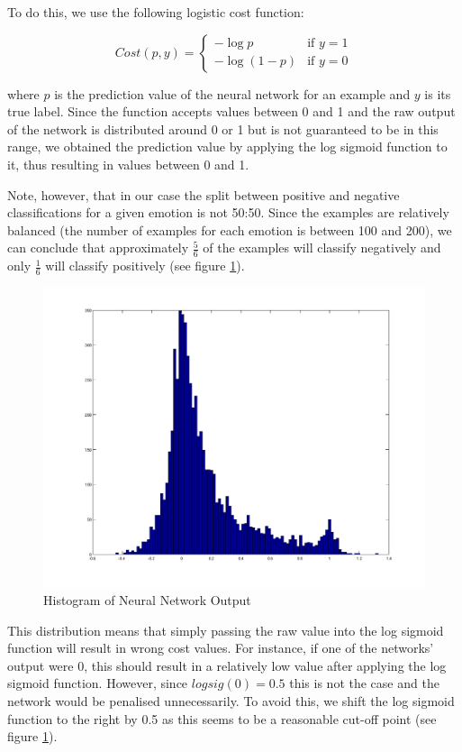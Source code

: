 \documentclass[10pt,a4paper]{article}
\begin{document}
To do this, we use the following logistic cost function:

\[
    Cost(p, y)= 
\begin{cases}
    -\log{p}& \text{if } y = 1\\
    -\log{(1 - p)}              & \text{if } y = 0
\end{cases}
\]

where $p$ is the prediction value of the neural network for an example and $y$ is its true label. Since the function accepts values between 0 and 1 and the raw output of the network is distributed around 0 or 1 but is not guaranteed to be in this range, we obtained the prediction value by applying the log sigmoid function to it, thus resulting in values between 0 and 1. 

Note, however, that in our case the split between positive and negative classifications for a given emotion is not 50:50. Since the examples are relatively balanced (the number of examples for each emotion is between 100 and 200), we can conclude that approximately $\frac{5}{6}$ of the examples will classify negatively and only $\frac{1}{6}$ will classify positively (see figure \ref{fig:examplesDistribution}).

\begin{figure}[!ht]
     \centering
     \includegraphics[scale=0.3]{../../images/clean_hist.png}
     \caption{Histogram of Neural Network Output}
     \label{fig:examplesDistribution}
\end{figure}

This distribution means that simply passing the raw value into the log sigmoid function will result in wrong cost values. For instance, if one of the networks' output were 0, this should result in a relatively low value after applying the log sigmoid function. However, since $logsig(0) = 0.5$ this is not the case and the network would be penalised unnecessarily. To avoid this, we shift the log sigmoid function to the right by 0.5 as this seems to be a reasonable cut-off point (see figure \ref{fig:examplesDistribution}).
\end{document}
